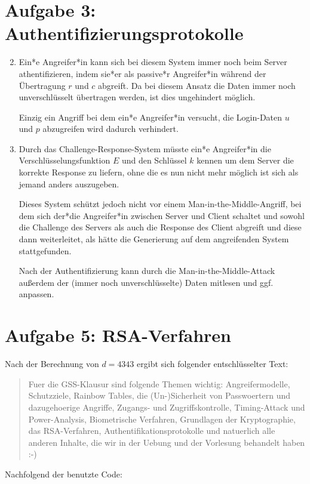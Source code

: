 \documentclass[a4paper,11pt,ngerman]{scrartcl}
\begin{document}
\section*{Aufgabe 3: Authentifizierungsprotokolle}
  \begin{enumerate}[\bf 1.]
    \setcounter{enumi}{1}
    \item
      Ein*e Angreifer*in kann sich bei diesem System immer noch beim Server athentifizieren,
      indem sie*er als passive*r Angreifer*in während der Übertragung $r$ und $c$ abgreift.
      Da bei diesem Ansatz die Daten immer noch unverschlüsselt übertragen werden, ist
      dies ungehindert möglich.

      Einzig ein Angriff bei dem ein*e Angreifer*in versucht, die Login-Daten $u$ und $p$
      abzugreifen wird dadurch verhindert.
    \item
      Durch das Challenge-Response-System müsste ein*e Angreifer*in die Verschlüsselungsfunktion
      $E$ und den Schlüssel $k$ kennen um dem Server die korrekte Response zu liefern,
      ohne die es nun nicht mehr möglich ist sich als jemand anders auszugeben.

      Dieses System schützt jedoch nicht vor einem Man-in-the-Middle-Angriff, bei dem
      sich der*die Angreifer*in zwischen Server und Client schaltet und sowohl die
      Challenge des Servers als auch die Response des Client abgreift und diese dann
      weiterleitet, als hätte die Generierung auf dem angreifenden System stattgefunden.

      Nach der Authentifizierung kann durch die Man-in-the-Middle-Attack außerdem der
      (immer noch unverschlüsselte) Daten mitlesen und ggf. anpassen.
  \end{enumerate}

\section*{Aufgabe 5: RSA-Verfahren}
  Nach der Berechnung von $d=4343$ ergibt sich folgender entschlüsselter Text:
    \begin{quote}
      Fuer die GSS-Klausur sind folgende Themen wichtig: Angreifermodelle, Schutzziele,
      Rainbow Tables, die (Un-)Sicherheit von Passwoertern und dazugehoerige Angriffe,
      Zugangs- und Zugriffskontrolle, Timing-Attack und Power-Analysis, Biometrische Verfahren,
      Grundlagen der Kryptographie, das RSA-Verfahren, Authentifikationsprotokolle und
      natuerlich alle anderen Inhalte, die wir in der Uebung und der Vorlesung behandelt
      haben :-)
    \end{quote}
  Nachfolgend der benutzte Code:
  \inputminted[linenos,numbersep=12pt,autogobble,frame=lines,framesep=2mm]{python3}{rsadecrypt.py}
\end{document}
